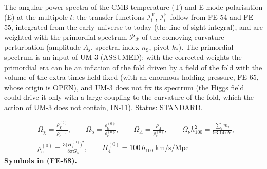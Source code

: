 \documentclass[
  10pt,
]{article}
\begin{document}
The angular power spectra of the CMB temperature (T) and E-mode
polarisation (E) at the multipole \(l\): the transfer functions
\(\mathcal{I}_l^{\mathrm{T}}\), \(\mathcal{I}_l^{\mathrm{E}}\) follow
from FE-54 and FE-55, integrated from the early universe to today (the
line-of-sight integral), and are weighted with the primordial spectrum
\(\mathcal{P}_{\mathcal{R}}\) of the comoving curvature perturbation
(amplitude \(A_{\mathrm{s}}\), spectral index \(n_{\mathrm{S}}\), pivot
\(k_*\)). The primordial spectrum is an input of UM-3 (ASSUMED): with
the corrected weights the primordial era can be an inflation of the fold
driven by a field of the fold with the volume of the extra times held
fixed (with an enormous holding pressure, FE-65, whose origin is OPEN),
and UM-3 does not fix its spectrum (the Higgs field could drive it only
with a large coupling to the curvature of the fold, which the action of
UM-3 does not contain, IN-11). Status: STANDARD.

\[
\begin{aligned}
&\Omega_\chi = \frac{\rho_\chi^{(0)}}{\rho_{\mathrm{c}}^{(0)}},\qquad \Omega_{\mathrm{b}} = \frac{\rho_{\mathrm{b}}^{(0)}}{\rho_{\mathrm{c}}^{(0)}},\qquad
 \Omega_\Lambda = \frac{\rho_\Lambda}{\rho_{\mathrm{c}}^{(0)}},\qquad \Omega_\nu h_{100}^2 = \frac{\sum_im_i}{93.14\ \text{eV}},\\
&\rho_{\mathrm{c}}^{(0)} = \frac{3\big(H_4^{(0)}\big)^2}{8\pi G_{\mathrm{N}}},\qquad H_4^{(0)} = 100\,h_{100}\ \text{km/s/Mpc}
\end{aligned} \tag{FE-58}
\] \textbf{Symbols in (FE-58).}
\end{document}
